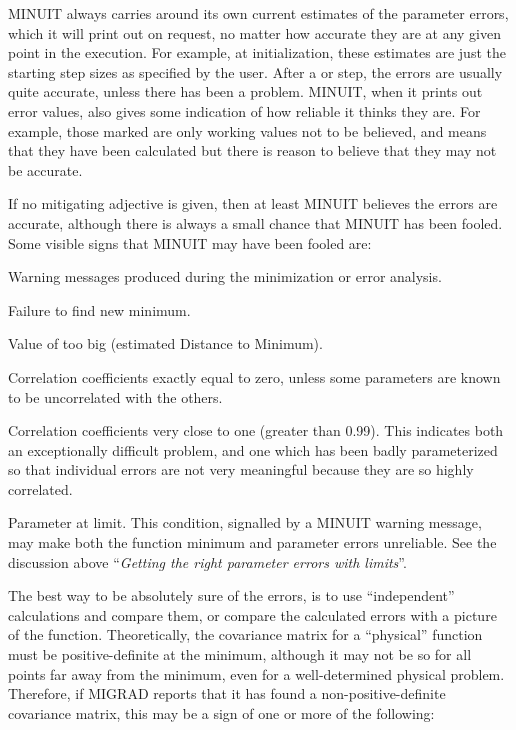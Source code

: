 MINUIT always carries around its own current estimates of the
parameter errors, which it will print out on request, no matter how
accurate they are at any given point in the execution.
For example, at initialization, these estimates are just the starting
step sizes as specified by the user.  
After a  or   step,
the errors are usually quite accurate, unless there has been a problem.
MINUIT, when it prints out error values,
also gives some indication of how reliable it thinks they are.
For example, those marked 
are only working values
not to be believed, and 
means that they have been
calculated but there is reason to believe that they may not be accurate.

If no mitigating adjective is given, then at least MINUIT believes
the errors are accurate, although there is always a small chance
that MINUIT has been fooled.
Some visible signs that MINUIT may have been fooled are:

\begin{UL}
\item Warning messages produced during the minimization or error analysis.
\item Failure to find new minimum.
\item Value of  too big (estimated Distance to Minimum).
\item Correlation coefficients exactly equal to zero, unless some 
      parameters are known to be uncorrelated with the others.
\item Correlation coefficients very close to one (greater than 0.99).
      This indicates both an exceptionally difficult problem, and one
      which has been badly parameterized so that individual errors are not
      very meaningful because they are so highly correlated.
\item Parameter at limit. This condition, signalled by a MINUIT warning
      message, may make both the function minimum and parameter errors
      unreliable. See the discussion above
      ``{\it Getting the right parameter errors with limits}''.
\end{UL}

The best way to be absolutely sure of the errors, is to use
``independent'' calculations and compare them, or compare the calculated
errors with a picture of the function.
Theoretically, the covariance matrix for a ``physical'' function must be
positive-definite at the minimum, although it may not be so
for all points far away from the minimum, even for a well-determined
physical problem. 
Therefore, if MIGRAD reports that it has found a
non-positive-definite covariance matrix, this may be
a sign of one or more of the following:

